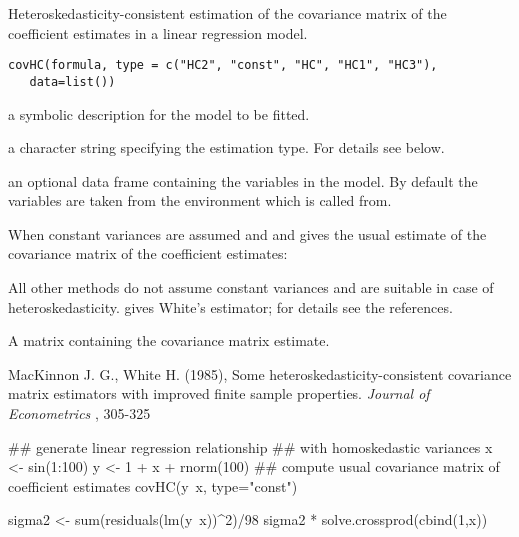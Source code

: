 \begin{Description}\relax
Heteroskedasticity-consistent estimation of the covariance matrix of the
coefficient estimates in a linear regression model.\end{Description}
\begin{Usage}
\begin{verbatim}
covHC(formula, type = c("HC2", "const", "HC", "HC1", "HC3"),
   data=list())
\end{verbatim}
\end{Usage}
\begin{Arguments}
\begin{ldescription}
\item[\code{formula}] a symbolic description for the model to be fitted.
\item[\code{type}] a character string specifying the estimation type. For
details see below.
\item[\code{data}] an optional data frame containing the variables in the model.
By default the variables are taken from the environment which 
is called from.
\end{ldescription}
\end{Arguments}
\begin{Details}\relax
When  constant variances are assumed and
and  gives the usual estimate of the covariance matrix of
the coefficient estimates:


All other methods do not assume constant variances and are suitable in case of
heteroskedasticity.  gives White's estimator; for details see the
references.\end{Details}
\begin{Value}
A matrix containing the covariance matrix estimate.\end{Value}
\begin{References}\relax
MacKinnon J. G., White H. (1985),
Some heteroskedasticity-consistent
covariance matrix estimators with improved finite sample properties.
\emph{Journal of Econometrics} , 305-325\end{References}
\begin{SeeAlso}\relax
{}\end{SeeAlso}
\begin{Examples}
\begin{ExampleCode}
## generate linear regression relationship
## with homoskedastic variances
x <- sin(1:100)
y <- 1 + x + rnorm(100)
## compute usual covariance matrix of coefficient estimates
covHC(y~x, type="const")

sigma2 <- sum(residuals(lm(y~x))^2)/98
sigma2 * solve.crossprod(cbind(1,x))
\end{ExampleCode}
\end{Examples}

